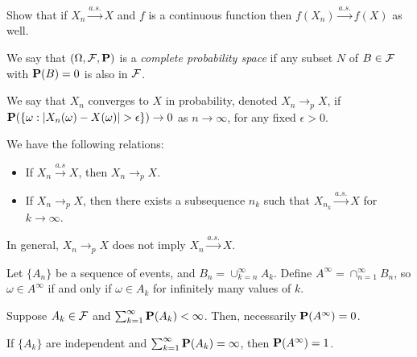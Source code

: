\begin{exercise*}
Show that if $X_n \xrightarrow{a.s.} X$ and $f$ is a continuous function then
$f(X_n) \xrightarrow{a.s.} f(X)$ as well.
\end{exercise*}

\begin{definition*} 
We say that $(\Omega, \mathcal{F}, \mathbf{P})$ is a \emph{complete probability space} if any
subset $N$ of $B \in \mathcal{F}$ with $\mathbf{P}(B) = 0$ is also in $\mathcal{F}$.
\end{definition*} 

\begin{definition*} 
We say that $X_n$ converges to $X$ in probability, denoted $X_n \rightarrow_p
X$, if $\mathbf{P}(\{\omega: |X_n(\omega) - X(\omega)| > \epsilon\}) \to 0$ as $n\rightarrow
\infty$, for any fixed $\epsilon > 0$.
\end{definition*} 

\begin{theorem*} 
We have the following relations:
\begin{itemize}
\item If $X_n \xrightarrow{a.s} X$, then $X_n \rightarrow_p X$.
\item If $X_n \rightarrow_p X$, then there exists a subsequence $n_k$ such that
$X_{n_k} \xrightarrow{a.s.} X$ for $k \rightarrow \infty$.
\end{itemize}
\end{theorem*} 

\begin{proposition*} 
In general, $X_n \rightarrow_p X$ does not imply $X_n \xrightarrow{a.s.} X$.
\end{proposition*} 

\begin{definition*} 
Let $\{A_n\}$ be a sequence of events, and $B_n = \cup_{k=n}^\infty A_k$. Define
$A^\infty = \cap_{n=1}^\infty B_n$, so $\omega \in A^\infty$ if and only if
$\omega \in A_k$ for infinitely many values of $k$.
\end{definition*} 

\begin{lemma*}
Suppose $A_k \in \mathcal{F}$ and $\sum_{k=1}^\infty \mathbf{P}(A_k) < \infty$. Then,
necessarily $\mathbf{P}(A^\infty) = 0$.
\end{lemma*} 

\begin{lemma*}
If $\{A_k\}$ are independent and $\sum_{k=1}^\infty \mathbf{P}(A_k) = \infty$, then
$\mathbf{P}(A^\infty) = 1$.
\end{lemma*} 

